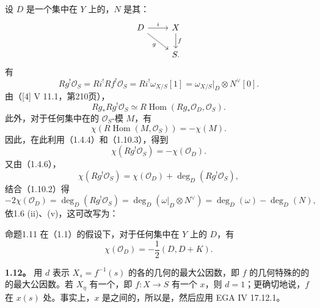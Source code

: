 设 $D$ 是一个集中在 $Y$ 上的，$N$ 是其：
\[
\begin{tikzcd}
D\arrow[r,"i"]\arrow[dr,"g"']&X\arrow[d,"f"]\\
&S.
\end{tikzcd}
\]
有
\begin{equation}
Rg^!\mathcal O_S=Ri^!Rf^!\mathcal O_S=Ri^!\omega_{X/S}[1]
=\omega_{X/S}|_D\otimes N^\vee[0].\tag{1.10.2}
\end{equation}
由（[4] V 11.1，第210页），
\begin{equation}
Rg_*Rg^!\mathcal O_S\simeq R\operatorname{Hom}(Rg_*\mathcal O_D,\mathcal O_S).\tag{1.10.3}
\end{equation}
此外，对于任何集中在的 $\mathcal O_S$-模 $M$，有
\begin{equation}\chi(R\operatorname{Hom}(M,\mathcal O_S))=-\chi(M).\tag{1.10.4}\end{equation}
因此，在此利用（1.4.4）和（1.10.3），得到
\[
\chi(Rg^!\mathcal O_S)=-\chi(\mathcal O_D).
\]
又由（1.4.6），
\[
\chi(Rg^!\mathcal O_S)=\chi(\mathcal O_D)+\deg_D(Rg^!\mathcal O_S),
\]
结合（1.10.2）得
\[
-2\chi(\mathcal O_D)=\deg_D(Rg^!\mathcal O_S)
=\deg_D(\omega|_D\otimes N^\vee)=\deg_D(\omega)-\deg_D(N),
\]
依1.6 (ii)、(v)，这可改写为：
\begin{SGAresult}{命题}{1.11}
在（1.1）的假设下，对于任何集中在 $Y$ 上的 $D$，有
\[
\chi(\mathcal O_D)=-\frac12(D,D+K).
\]
\end{SGAresult}
\textbf{1.12。} 用 $d$ 表示 $X_s=f^{-1}(s)$ 的各的几何的最大公因数，即 $f$ 的几何特殊的的的最大公因数。若 $X_\eta$ 有一个，即 $f:X\to S$ 有一个 $x$，则 $d=1$；更确切地说，$f$ 在 $x(s)$ 处。事实上，$x$ 是之间的，所以是，然后应用 EGA IV 17.12.1。

